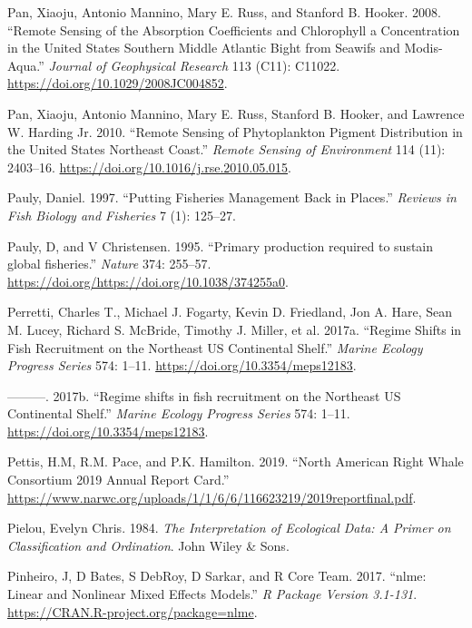 \documentclass[
]{book}
\begin{document}
\leavevmode\hypertarget{ref-SOE12}{}%
Pan, Xiaoju, Antonio Mannino, Mary E. Russ, and Stanford B. Hooker. 2008. ``Remote Sensing of the Absorption Coefficients and Chlorophyll a Concentration in the United States Southern Middle Atlantic Bight from Seawifs and Modis-Aqua.'' \emph{Journal of Geophysical Research} 113 (C11): C11022. \url{https://doi.org/10.1029/2008JC004852}.

\leavevmode\hypertarget{ref-SOE13}{}%
Pan, Xiaoju, Antonio Mannino, Mary E. Russ, Stanford B. Hooker, and Lawrence W. Harding Jr. 2010. ``Remote Sensing of Phytoplankton Pigment Distribution in the United States Northeast Coast.'' \emph{Remote Sensing of Environment} 114 (11): 2403--16. \url{https://doi.org/10.1016/j.rse.2010.05.015}.

\leavevmode\hypertarget{ref-pauly_putting_1997}{}%
Pauly, Daniel. 1997. ``Putting Fisheries Management Back in Places.'' \emph{Reviews in Fish Biology and Fisheries} 7 (1): 125--27.

\leavevmode\hypertarget{ref-pauly1995ppr}{}%
Pauly, D, and V Christensen. 1995. ``Primary production required to sustain global fisheries.'' \emph{Nature} 374: 255--57. \url{https://doi.org/https://doi.org/10.1038/374255a0}.

\leavevmode\hypertarget{ref-perretti_regime_2017}{}%
Perretti, Charles T., Michael J. Fogarty, Kevin D. Friedland, Jon A. Hare, Sean M. Lucey, Richard S. McBride, Timothy J. Miller, et al. 2017a. ``Regime Shifts in Fish Recruitment on the Northeast US Continental Shelf.'' \emph{Marine Ecology Progress Series} 574: 1--11. \url{https://doi.org/10.3354/meps12183}.

\leavevmode\hypertarget{ref-Perretti2017}{}%
---------. 2017b. ``Regime shifts in fish recruitment on the Northeast US Continental Shelf.'' \emph{Marine Ecology Progress Series} 574: 1--11. \url{https://doi.org/10.3354/meps12183}.

\leavevmode\hypertarget{ref-narw2019}{}%
Pettis, H.M, R.M. Pace, and P.K. Hamilton. 2019. ``North American Right Whale Consortium 2019 Annual Report Card.'' \url{https://www.narwc.org/uploads/1/1/6/6/116623219/2019reportfinal.pdf}.

\leavevmode\hypertarget{ref-Pielou1984}{}%
Pielou, Evelyn Chris. 1984. \emph{The Interpretation of Ecological Data: A Primer on Classification and Ordination}. John Wiley \& Sons.

\leavevmode\hypertarget{ref-Pinheiro2017}{}%
Pinheiro, J, D Bates, S DebRoy, D Sarkar, and R Core Team. 2017. ``nlme: Linear and Nonlinear Mixed Effects Models.'' \emph{R Package Version 3.1-131}. \url{https://CRAN.R-project.org/package=nlme}.
\end{document}
